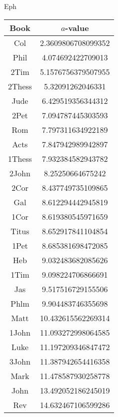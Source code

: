 \documentclass[12pt,letterpaper]{article}
\begin{document}
Eph
\begin{longtable}{|c|c|}
\hline
 Book & $a$-value \\ \hline
Col & 2.3609806708099352 \\ \hline
 Phil & 4.074692422709013 \\ \hline
 2Tim & 5.1576756379507955 \\ \hline
 2Thess & 5.32091262046331 \\ \hline
 Jude & 6.429519356344312 \\ \hline
 2Pet & 7.094787445303593 \\ \hline
 Rom & 7.797311634922189 \\ \hline
 Acts & 7.847942989942897 \\ \hline
 1Thess & 7.932384582943782 \\ \hline
 2John & 8.25250664675242 \\ \hline
 2Cor & 8.437749735109865 \\ \hline
 Gal & 8.612294442945819 \\ \hline
 1Cor & 8.619380545971659 \\ \hline
 Titus & 8.652917841104854 \\ \hline
 1Pet & 8.685381698472085 \\ \hline
 Heb & 9.032483682085626 \\ \hline
 1Tim & 9.098224706866691 \\ \hline
 Jas & 9.517516729155506 \\ \hline
 Phlm & 9.904483746355698 \\ \hline
 Matt & 10.432615562269314 \\ \hline
 1John & 11.093272998064585 \\ \hline
 Luke & 11.197209346847472 \\ \hline
 3John & 11.387942654416358 \\ \hline
 Mark & 11.478587930258778 \\ \hline
 John & 13.492052186245019 \\ \hline
 Rev & 14.632467106599286 \\ \hline 
\end{longtable}
\end{document}

